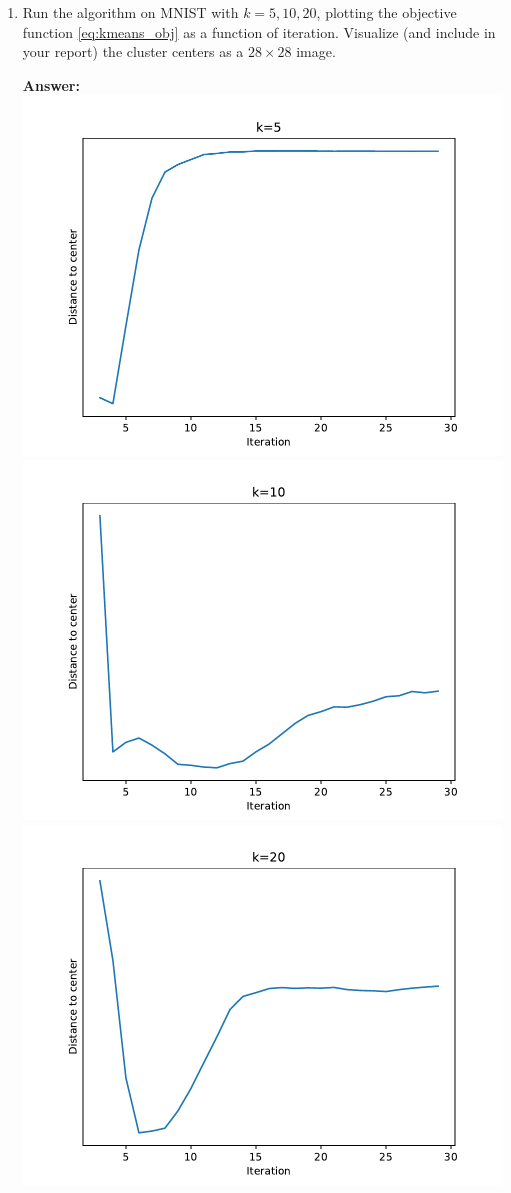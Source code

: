 \documentclass{article}
\newcommand{\1}{\mathbf{1}}
\begin{document}
\begin{enumerate}
    \item Run the algorithm on MNIST with $k=5,10,20$, plotting the objective function \eqref{eq:kmeans_obj} as a function of iteration. Visualize (and include in your report) the cluster centers as a $28\times 28$ image.
    
    \textbf{Answer:}\\
    \includegraphics[width=4 in]{Figures/error5.pdf}\\
    \includegraphics[width=4 in]{Figures/error10.pdf}\\
    \includegraphics[width=4 in]{Figures/error20.pdf}\\
    

\end{enumerate}
\end{document}
